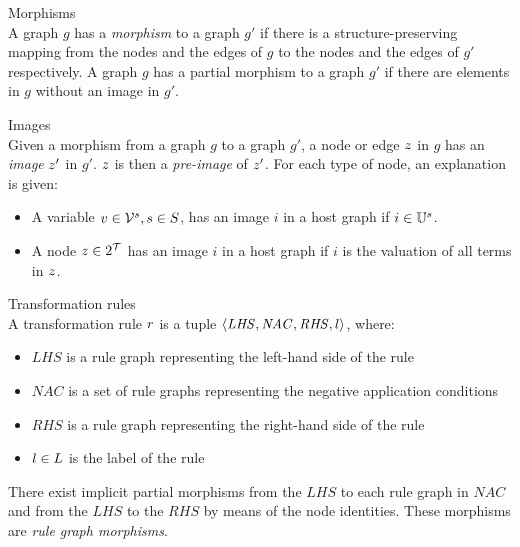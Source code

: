 \vspace{10px}
\begin{definition} Morphisms \\
A graph $g$ has a \textit{morphism} to a graph $g'$ if there is a structure-preserving mapping from the nodes and the edges of $g$ to the nodes and the edges of $g'$ respectively. A graph $g$ has a partial morphism to a graph $g'$ if there are elements in $g$ without an image in $g'$.
\end{definition}
\vspace{10px}

\begin{definition} Images \\
Given a morphism from a graph $g$ to a graph $g'$, a node or edge $z$ in $g$ has an \textit{image} $z'$ in $g'$. $z$ is then a \textit{pre-image} of $z'$. For each type of node, an explanation is given:
\begin{itemize}
  \item A variable $v \in \mathcal{V}^{s}, s \in S$, has an image $i$ in a host graph if $i \in \mathbb{U}^{s}$. 
  \item A node $z \in 2^{\mathcal{T}}$ has an image $i$ in a host graph if $i$ is the valuation of all terms in $z$. 
\end{itemize}
\end{definition}

\vspace{10px}
\begin{definition} Transformation rules \\
A transformation rule $r$ is a tuple $\langle \mathit{LHS}, \mathit{NAC}, \mathit{RHS}, l \rangle$, where:
\begin{itemize}
  \item $\mathit{LHS}$ is a rule graph representing the left-hand side of the rule
  \item $\mathit{NAC}$ is a set of rule graphs representing the negative application conditions
  \item $\mathit{RHS}$ is a rule graph representing the right-hand side of the rule
  \item $l \in L$ is the label of the rule
\end{itemize}
There exist implicit partial morphisms from the $\mathit{LHS}$ to each rule graph in $\mathit{NAC}$ and from the $\mathit{LHS}$ to the $\mathit{RHS}$ by means of the node identities. These morphisms are \textit{rule graph morphisms}.
\end{definition}
\vspace{10px}

